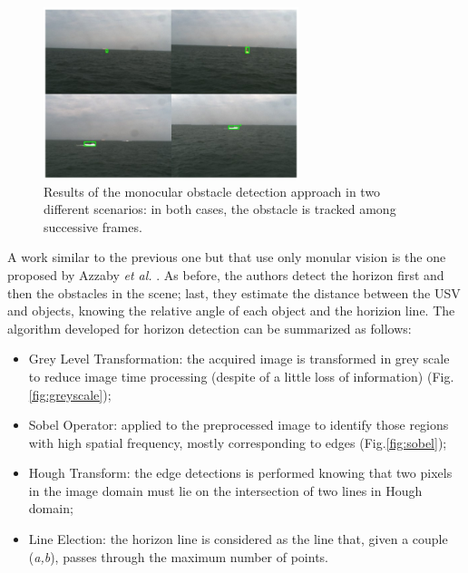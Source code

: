 \documentclass[12pt]{article}
\begin{document}
      \begin{figure}
            \centering
            \includegraphics[height=5cm]{./Images/Wang/monocular}
            \caption{Results of the monocular obstacle detection approach in two different scenarios: in both cases, the obstacle is tracked among successive frames.}
            \label{fig:monocular}
      \end{figure}

      \indent A work similar to the previous one but that use only monular vision is the one proposed by Azzaby \textit{et al.} \parencite{Azzabi}. As before, the authors detect the horizon first and then the obstacles in the scene; last, they estimate the distance between the USV and objects, knowing the relative angle of each object and the horizion line. The algorithm developed for horizon detection can be summarized as follows:
            \begin{itemize}
                  \item Grey Level Transformation: the acquired image is transformed in grey scale to reduce image time processing (despite of a little loss of information) (Fig.\ref{fig:greyscale});
                  \item Sobel Operator: applied to the preprocessed image to identify those regions with high spatial frequency, mostly corresponding to edges \parencite{Maini2009} (Fig.\ref{fig:sobel});
                  \item Hough Transform: the edge detections is performed \parencite{Hough_1962} knowing that two pixels in the image domain must lie on the intersection of two lines in Hough domain;
                  \item Line Election: the horizon line is considered as the line that, given a couple (\textit{a,b}), passes through the maximum number of points.
            \end{itemize}
\end{document}
